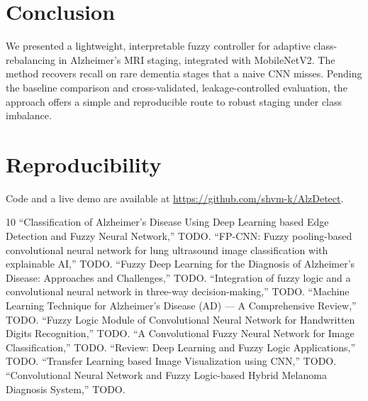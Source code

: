 \documentclass[journal]{IEEEtran}
\begin{document}
\section{Conclusion}
We presented a lightweight, interpretable fuzzy controller for adaptive
class-rebalancing in Alzheimer's MRI staging, integrated with MobileNetV2. The
method recovers recall on rare dementia stages that a naive CNN misses. Pending
the baseline comparison and cross-validated, leakage-controlled evaluation, the
approach offers a simple and reproducible route to robust staging under class
imbalance.

\section*{Reproducibility}
Code and a live demo are available at
\url{https://github.com/shvm-k/AlzDetect}.

\begin{thebibliography}{10}
\small
 ``Classification of Alzheimer's Disease Using Deep Learning based
Edge Detection and Fuzzy Neural Network,'' TODO.
 ``FP-CNN: Fuzzy pooling-based convolutional neural network for
lung ultrasound image classification with explainable AI,'' TODO.
 ``Fuzzy Deep Learning for the Diagnosis of Alzheimer's Disease:
Approaches and Challenges,'' TODO.
 ``Integration of fuzzy logic and a convolutional neural network in
three-way decision-making,'' TODO.
 ``Machine Learning Technique for Alzheimer's Disease (AD) --- A
Comprehensive Review,'' TODO.
 ``Fuzzy Logic Module of Convolutional Neural Network for
Handwritten Digits Recognition,'' TODO.
 ``A Convolutional Fuzzy Neural Network for Image Classification,''
TODO.
 ``Review: Deep Learning and Fuzzy Logic Applications,'' TODO.
 ``Transfer Learning based Image Visualization using CNN,'' TODO.
 ``Convolutional Neural Network and Fuzzy Logic-based Hybrid
Melanoma Diagnosis System,'' TODO.
\end{thebibliography}
\end{document}
